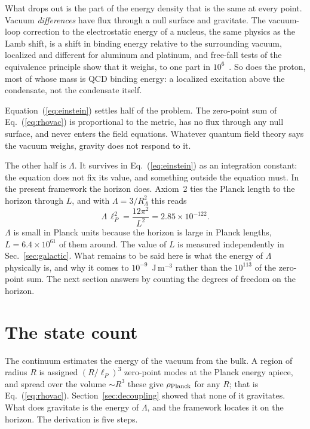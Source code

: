\documentclass[aps,prd,twocolumn,superscriptaddress,nofootinbib,showkeys]{revtex4-2}
\begin{document}
What drops out is the part of the energy density that is the same at every point. Vacuum \emph{differences} have flux through a null surface and gravitate. The vacuum-loop correction to the electrostatic energy of a nucleus, the same physics as the Lamb shift, is a shift in binding energy relative to the surrounding vacuum, localized and different for aluminum and platinum, and free-fall tests of the equivalence principle show that it weighs, to one part in $10^6$~\cite{polchinski2006,bousso2008}. So does the proton, most of whose mass is QCD binding energy: a localized excitation above the condensate, not the condensate itself.

Equation~(\ref{eq:einstein}) settles half of the problem. The zero-point sum of Eq.~(\ref{eq:rhovac}) is proportional to the metric, has no flux through any null surface, and never enters the field equations. Whatever quantum field theory says the vacuum weighs, gravity does not respond to it.

The other half is $\Lambda$. It survives in Eq.~(\ref{eq:einstein}) as an integration constant: the equation does not fix its value, and something outside the equation must. In the present framework the horizon does. Axiom~2 ties the Planck length to the horizon through $L$, and with $\Lambda = 3/R_\Lambda^2$ this reads
\begin{equation}
\Lambda\,\ell_P^2 = \frac{12\pi^2}{L^2} = 2.85\times10^{-122}.
\label{eq:LamL}
\end{equation}
$\Lambda$ is small in Planck units because the horizon is large in Planck lengths, $L = 6.4\times10^{61}$ of them around. The value of $L$ is measured independently in Sec.~\ref{sec:galactic}. What remains to be said here is what the energy of $\Lambda$ physically is, and why it comes to $10^{-9}$~J\,m$^{-3}$ rather than the $10^{113}$ of the zero-point sum. The next section answers by counting the degrees of freedom on the horizon.

\section{The state count}
\label{sec:count}

The continuum estimates the energy of the vacuum from the bulk. A region of radius $R$ is assigned $(R/\ell_P)^3$ zero-point modes at the Planck energy apiece, and spread over the volume $\sim R^3$ these give $\rho_{\rm Planck}$ for any $R$; that is Eq.~(\ref{eq:rhovac}). Section~\ref{sec:decoupling} showed that none of it gravitates. What does gravitate is the energy of $\Lambda$, and the framework locates it on the horizon. The derivation is five steps.
\end{document}

